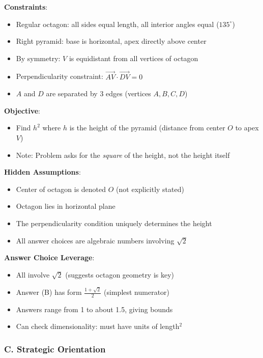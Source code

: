 \documentclass[12pt]{article}
\begin{document}
\begin{problemconfigbox}
\textbf{Constraints}:
\begin{itemize}
    \item Regular octagon: all sides equal length, all interior angles equal ($135^\circ$)
    \item Right pyramid: base is horizontal, apex directly above center
    \item By symmetry: $V$ is equidistant from all vertices of octagon
    \item Perpendicularity constraint: $\overrightarrow{AV} \cdot \overrightarrow{DV} = 0$
    \item $A$ and $D$ are separated by 3 edges (vertices $A, B, C, D$)
\end{itemize}

\textbf{Objective}:
\begin{itemize}
    \item Find $h^2$ where $h$ is the height of the pyramid (distance from center $O$ to apex $V$)
    \item Note: Problem asks for the \textit{square} of the height, not the height itself
\end{itemize}

\textbf{Hidden Assumptions}:
\begin{itemize}
    \item Center of octagon is denoted $O$ (not explicitly stated)
    \item Octagon lies in horizontal plane
    \item The perpendicularity condition uniquely determines the height
    \item All answer choices are algebraic numbers involving $\sqrt{2}$
\end{itemize}

\textbf{Answer Choice Leverage}:
\begin{itemize}
    \item All involve $\sqrt{2}$ (suggests octagon geometry is key)
    \item Answer (B) has form $\frac{1+\sqrt{2}}{2}$ (simplest numerator)
    \item Answers range from 1 to about 1.5, giving bounds
    \item Can check dimensionality: must have units of length$^2$
\end{itemize}

\subsubsection*{C. Strategic Orientation}


\end{problemconfigbox}
\end{document}
